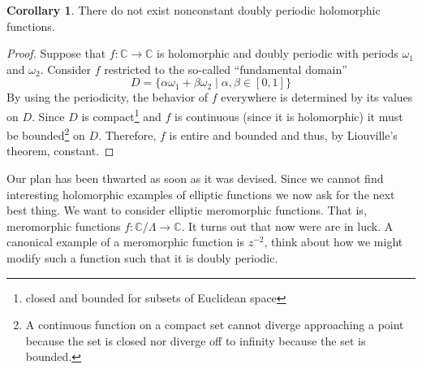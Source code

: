 \documentclass{article}
\newcommand{\C}{\mathbb{C}}
\theoremstyle{definition}
\newtheorem{corollary}[theorem]{Corollary}
\begin{document}
\begin{corollary}
There do not exist nonconstant doubly periodic holomorphic functions.
\end{corollary}

\begin{proof}
Suppose that $f : \C \to \C$ is holomorphic and doubly periodic with periods $\omega_1$ and $\omega_2$. Consider $f$ restricted to the so-called ``fundamental domain''
\[ D = \{ \alpha \omega_1 + \beta \omega_2 \mid \alpha, \beta \in [0, 1] \} \]
By using the periodicity, the behavior of $f$ everywhere is determined by its values on $D$. 
Since $D$ is compact\footnote{closed and bounded for subsets of Euclidean space} and $f$ is continuous (since it is holomorphic) it must be bounded\footnote{A continuous function on a compact set cannot diverge approaching a point because the set is closed nor diverge off to infinity because the set is bounded.} on $D$. Therefore, $f$ is entire and bounded and thus, by Liouville's theorem, constant. 
\end{proof}
Our plan has been thwarted as soon as it was devised. Since we cannot find interesting holomorphic examples of elliptic functions we now ask for the next best thing.
We want to consider elliptic meromorphic functions. That is, meromorphic functions $f : \C / \Lambda \to \C$. It turns out that now were are in luck. A canonical example of a meromorphic function is $z^{-2}$, think about how we might modify such a function such that it is doubly periodic.
\end{document}
